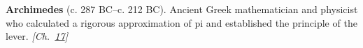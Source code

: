 \textbf{Archimedes} (c. 287 BC–c. 212 BC). Ancient Greek mathematician and physicist who calculated a rigorous approximation of pi and established the principle of the lever. \emph{[Ch.~\hyperref[ch:bignumbers]{17}]}

